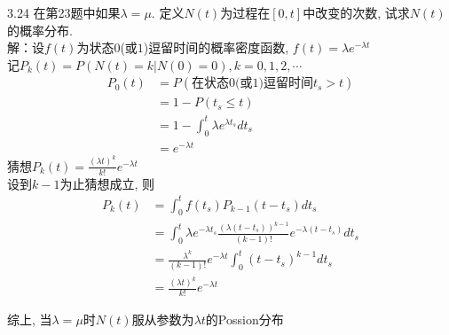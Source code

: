 3.24 在第23题中如果$\lambda = \mu$. 定义$N(t)$为过程在$[0,t]$中改变的次数, 试求$N(t)$的概率分布.\\
解：设$f(t)$为状态$0$(或$1$)逗留时间的概率密度函数, $f(t) = \lambda e^{-\lambda t}$\\
	记$P_k(t) = P\left(N(t) = k | N(0) = 0 \right), k = 0,1,2,\cdots$\\
	\[
	\begin{split}
	P_0(t) & = P(\text{在状态$0$(或$1$)逗留时间$t_s > t$})\\
			& = 1 - P(t_s \leqslant t)\\
			& = 1-\int^t_0 \lambda e^{\lambda t_s}dt_s\\
			& = e^{-\lambda t}
	\end{split}
	\]
	猜想$P_k(t) = \frac{(\lambda t)^k}{k!} e^{-\lambda t}$\\
	设到$k-1$为止猜想成立, 则
	\[
	\begin{split}
	P_k(t) & = \int^t_0 f(t_s)P_{k-1}(t-t_s)dt_s\\
			& = \int^t_0 \lambda e^{-\lambda t_s} \frac{\left(\lambda(t-t_s)\right)^{k-1}}{(k-1)!} e^{-\lambda(t-t_s)}dt_s\\
			& = \frac{{\lambda}^k}{(k-1)!} e^{-\lambda t}\int^t_0(t-t_s)^{k-1}dt_s\\
			& = \frac{(\lambda t)^k}{k!}e^{-\lambda t}
	\end{split}
	\]

综上, 当$\lambda = \mu$时$N(t)$服从参数为$\lambda t$的Possion分布









